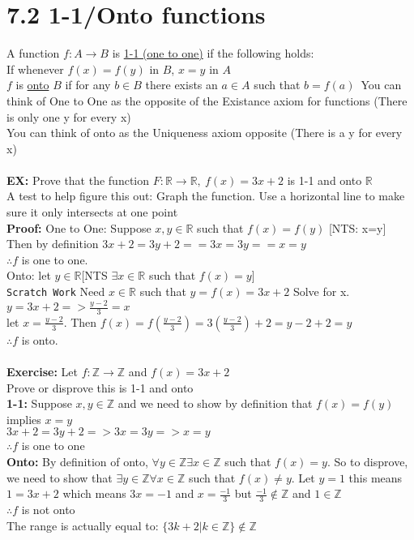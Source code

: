 \documentclass{article}
\begin{document}
 		\section[04/12/18]{7.2 1-1/Onto functions}
 		A function $f:A\rightarrow B$ is \underline{1-1 (one to one)} if the following holds:\\
 		If whenever $f(x)=f(y)$ in $B$, $x=y$ in $A$\\
 		$f$ is \underline{onto} $B$ if for any $b\in B$ there exists an $a\in A$ such that $b=f(a)$\
 		You can think of One to One as the opposite of the Existance axiom for functions (There is only one y for every x)\\
 		You can think of onto as the Uniqueness axiom opposite (There is a y for every x)\\ \\
 		\textbf{EX:} Prove that the function $F:\mathbb{R}\rightarrow\mathbb{R},\ f(x)=3x+2$ is 1-1 and onto $\mathbb{R}$\\
 		A test to help figure this out: Graph the function. Use a horizontal line to make sure it only intersects at one point\\
 		\textbf{Proof:} One to One: Suppose $x,y\in\mathbb{R}$ such that $f(x)=f(y)$ [NTS: x=y]\\
 		Then by definition $3x+2=3y+2 ==3x=3y==x=y$\\
 		$\therefore f$ is one to one.\\
 		Onto: let $y\in\mathbb{R}$[NTS $\exists x\in\mathbb{R}$ such that $f(x)=y$]\\
 		\texttt{Scratch Work} Need $x\in\mathbb{R}$ such that $y=f(x)=3x+2$ Solve for x. $y=3x+2=>\frac{y-2}{3}=x$\\
 		let $x=\frac{y-2}{3}$. Then $f(x)=f(\frac{y-2}{3})=3(\frac{y-2}{3})+2=y-2+2=y$\\
 		$\therefore f$ is onto.\\ \\
 		\textbf{Exercise:} Let $f: \mathbb{Z} \rightarrow \mathbb{Z}$ and $f(x)=3x+2$\\
 		Prove or disprove this is 1-1 and onto\\
 		\textbf{1-1:} Suppose $x,y\in\mathbb{Z}$ and we need to show by definition that $f(x)=f(y)$ implies $x=y$\\
 		$3x+2=3y+2 =>3x=3y=> x=y$\\
 		$\therefore f$ is one to one\\
 		\textbf{Onto:} By definition of onto, $\forall y\in\mathbb{Z} \exists x\in\mathbb{Z}$ such that $f(x)=y$. So to disprove, we need to show that $\exists y\in\mathbb{Z}\forall x\in\mathbb{Z}$ such that $f(x)\neq y$. Let $y=1$ this means $1=3x+2$ which means $3x=-1$ and $x=\frac{-1}{3}$ but $\frac{-1}{3}\notin\mathbb{Z}$ and $1\in\mathbb{Z}$\\
 		$\therefore f$ is not onto\\
 		The range is actually equal to: $\{3k+2|k\in\mathbb{Z}\}\notin\mathbb{Z}$ 
\end{document}
